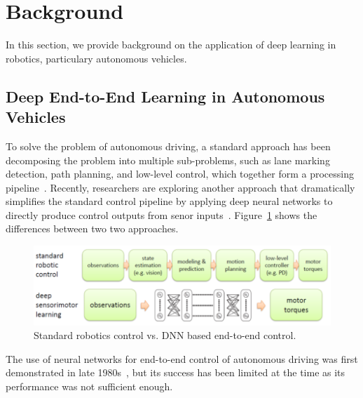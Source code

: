\section{Background} \label{sec:background}

In this section, we provide background on the application of deep
learning in robotics, particulary autonomous vehicles.

\subsection{Deep End-to-End Learning in Autonomous Vehicles}


To solve the problem of autonomous driving, a standard approach has
been decomposing the problem into multiple sub-problems,
such as lane marking detection, path planning, and low-level
control, which together form a processing pipeline~\cite{Bojarski2016}.
Recently, researchers are exploring another approach that dramatically
simplifies the standard control pipeline by applying deep neural
networks to directly produce control outputs from senor
inputs~\cite{Levine2016}. Figure~\ref{fig:end-to-end-control}
shows the differences between two two approaches.

\begin{figure}[h]
  \centering
  \includegraphics[width=.5\textwidth]{figs/endtoend}
  \caption{Standard robotics control vs. DNN based end-to-end
    control. }
  \label{fig:end-to-end-control}
\end{figure}

The use of neural networks for end-to-end control of autonomous
driving was first demonstrated in late 1980s~\cite{Pomerleau1989}, but
its success has been limited at the time as its performance was not
sufficient enough. 


